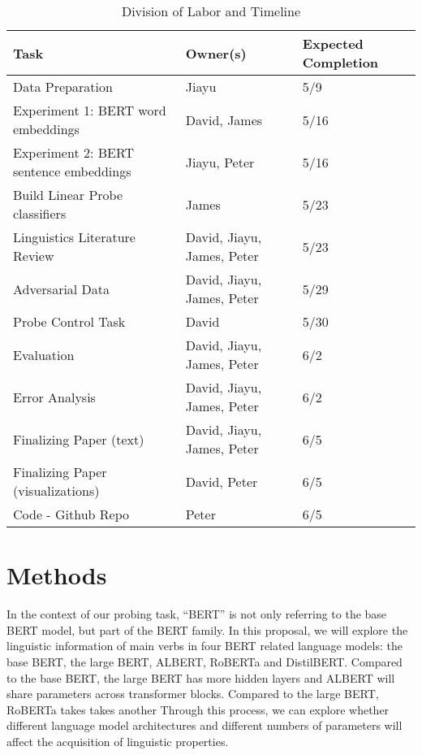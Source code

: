 \documentclass[11pt]{article}
\begin{document}
\begin{table*}[hbt!]
\begin{tabular}{|lll|}
\hline
\textbf{Task}                          & \textbf{Owner(s)}          & \textbf{Expected Completion} \\
\hline
Data Preparation                       & Jiayu                      & 5/9                          \\
Experiment 1: BERT word embeddings     & David, James               & 5/16                         \\
Experiment 2: BERT sentence embeddings & Jiayu, Peter               & 5/16                         \\
Build Linear Probe classifiers         & James                      & 5/23                         \\
Linguistics Literature Review          & David, Jiayu, James, Peter & 5/23                         \\
Adversarial Data                       & David, Jiayu, James, Peter & 5/29                         \\
Probe Control Task                     & David                      & 5/30                         \\
Evaluation                             & David, Jiayu, James, Peter & 6/2                          \\
Error Analysis                         & David, Jiayu, James, Peter & 6/2                          \\
Finalizing Paper (text)                & David, Jiayu, James, Peter & 6/5                          \\
Finalizing Paper (visualizations)      & David, Peter               & 6/5                          \\
Code - Github Repo                     & Peter                      & 6/5    \\
\hline
\end{tabular}
\caption{Division of Labor and Timeline}
\label{tab:labor}
\end{table*}

\section{Methods}
\label{sec:methods}
In the context of our probing task, ``BERT'' is not only referring to the base BERT model, but part of the BERT family. In this proposal, we will explore the linguistic information of main verbs in four BERT related language models: the base BERT, the large BERT, ALBERT, RoBERTa and DistilBERT. Compared to the base BERT, the large BERT has more hidden layers and ALBERT will share parameters across transformer blocks. Compared to the large BERT, RoBERTa takes takes another  Through this process, we can explore whether different language model architectures and different numbers of parameters will affect the acquisition of linguistic properties.
\end{document}
